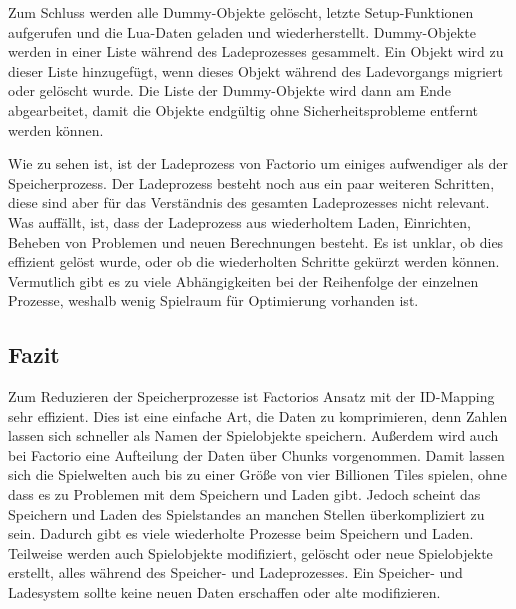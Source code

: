 Zum Schluss werden alle Dummy-Objekte gelöscht, letzte Setup-Funktionen aufgerufen und die Lua-Daten geladen und wiederherstellt. Dummy-Objekte werden in einer Liste während des Ladeprozesses gesammelt. Ein Objekt wird zu dieser Liste hinzugefügt, wenn dieses Objekt während des Ladevorgangs migriert oder gelöscht wurde. Die Liste der Dummy-Objekte wird dann am Ende abgearbeitet, damit die Objekte endgültig ohne Sicherheitsprobleme entfernt werden können.\cite{factorioGithubSaveLoad}

Wie zu sehen ist, ist der Ladeprozess von Factorio um einiges aufwendiger als der Speicherprozess. Der Ladeprozess besteht noch aus ein paar weiteren Schritten, diese sind aber für das Verständnis des gesamten Ladeprozesses nicht relevant. Was auffällt, ist, dass der Ladeprozess aus wiederholtem Laden, Einrichten, Beheben von Problemen und neuen Berechnungen besteht. Es ist unklar, ob dies effizient gelöst wurde, oder ob die wiederholten Schritte gekürzt werden können. Vermutlich gibt es zu viele Abhängigkeiten bei der Reihenfolge der einzelnen Prozesse, weshalb wenig Spielraum für Optimierung vorhanden ist.



\subsection{Fazit}
Zum Reduzieren der Speicherprozesse ist Factorios Ansatz mit der ID-Mapping sehr effizient. Dies ist eine einfache Art, die Daten zu komprimieren, denn Zahlen lassen sich schneller als Namen der Spielobjekte speichern. Außerdem wird auch bei Factorio eine Aufteilung der Daten über Chunks vorgenommen. Damit lassen sich die Spielwelten auch bis zu einer Größe von vier Billionen Tiles spielen, ohne dass es zu Problemen mit dem Speichern und Laden gibt. Jedoch scheint das Speichern und Laden des Spielstandes an manchen Stellen überkompliziert zu sein. Dadurch gibt es viele wiederholte Prozesse beim Speichern und Laden. Teilweise werden auch Spielobjekte modifiziert, gelöscht oder neue Spielobjekte erstellt, alles während des Speicher- und Ladeprozesses. Ein Speicher- und Ladesystem sollte keine neuen Daten erschaffen oder alte modifizieren.



